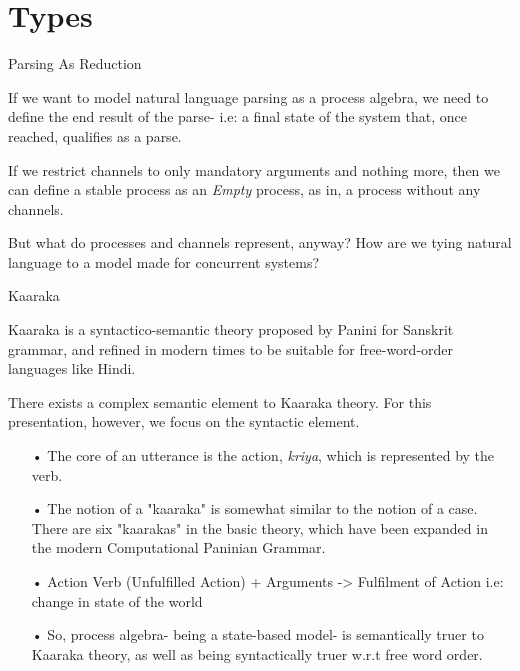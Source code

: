 \documentclass{beamer}
\begin{document}
\section{Types}

\begin{frame}{Parsing As Reduction}

If we want to model natural language parsing as a process algebra, we need to define the end result of the parse- i.e: a final state of the system that, once reached, qualifies as a parse.

If we restrict channels to only mandatory arguments and nothing more, then we can define a stable process as an \textit{Empty} process, as in, a process without any channels.

But what do processes and channels represent, anyway? How are we tying natural language to a model made for concurrent systems?

\end{frame}

\begin{frame}{Kaaraka}

Kaaraka is a syntactico-semantic theory proposed by Panini for Sanskrit grammar, and refined in modern times to be suitable for free-word-order languages like Hindi.

There exists a complex semantic element to Kaaraka theory. For this presentation, however, we focus on the syntactic element.

\begin{itemize}
\item[•]
The core of an utterance is the action, \textit{kriya}, which is represented by the verb.
\item[•]
The notion of a "kaaraka" is somewhat similar to the notion of a case. There are six "kaarakas" in the basic theory, which have been expanded in the modern Computational Paninian Grammar.
\item[•]
Action Verb (Unfulfilled Action) + Arguments -> Fulfilment of Action i.e: change in state of the world
\item[•]
So, process algebra- being a state-based model- is semantically truer to Kaaraka theory, as well as being syntactically truer w.r.t free word order.
\end{itemize}

\end{frame}
\end{document}
